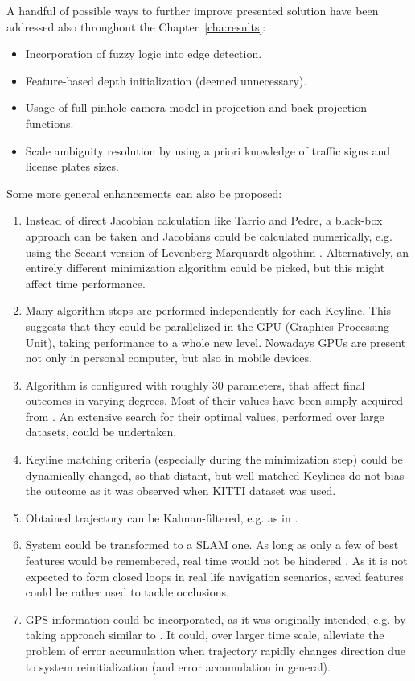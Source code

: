 
A handful of possible ways to further improve presented solution have been addressed also throughout the Chapter~\ref{cha:results}:
\begin{itemize}
	\item Incorporation of fuzzy logic into edge detection.
	\item Feature-based depth initialization (deemed unnecessary).
	\item Usage of full pinhole camera model in projection and back-projection functions.
	\item Scale ambiguity resolution by using a priori knowledge of traffic signs and license plates sizes.
\end{itemize}

Some more general enhancements can also be proposed:
\begin{enumerate}
	\item Instead of direct Jacobian calculation like Tarrio and Pedre, a black-box approach can be taken and Jacobians could be calculated numerically, e.g. using the Secant version of Levenberg-Marquardt algothim \cite{madsen2004methods}. Alternatively, an entirely different minimization algorithm could be picked, but this might affect time performance.
	\item Many algorithm steps are performed independently for each Keyline. This suggests that they could be parallelized in the GPU (Graphics Processing Unit), taking performance to a whole new level. Nowadays GPUs are present not only in personal computer, but also in mobile devices.
	\item Algorithm is configured with roughly 30 parameters, that affect final outcomes in varying degrees. Most of their values have been simply acquired from \cite{jose2015realtime}. An extensive search for their optimal values, performed over large datasets, could be undertaken.
	\item Keyline matching criteria (especially during the minimization step) could be dynamically changed, so that distant, but well-matched Keylines do not bias the outcome as it was observed when KITTI \cite{kitti} dataset was used.
	\item Obtained trajectory can be Kalman-filtered, e.g. as in \cite{min2015visual}.
	\item System could be transformed to a SLAM one. As long as only a few of best features would be remembered, real time would not be hindered \cite{monoslam}. As it is not expected to form closed loops in real life navigation scenarios, saved features could be rather used to tackle occlusions.
	\item GPS information could be incorporated, as it was originally intended; e.g. by taking approach similar to \cite{accurate_global_localization}. It could, over larger time scale, alleviate the problem of error accumulation when trajectory rapidly changes direction due to system reinitialization (and error accumulation in general).
\end{enumerate}


